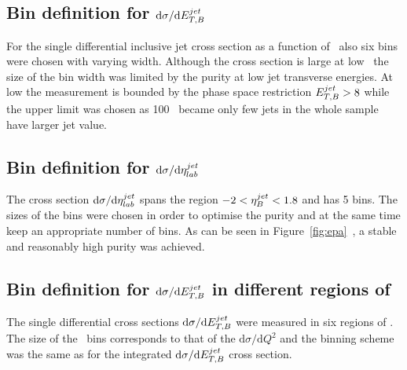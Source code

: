 \subsection*{Bin definition for ${\mathrm{d}\sigma}/{\mathrm{d}\mbox{$E_{T,B}^{jet}$}}$}
\label{subsec:bindefet}
For the single differential inclusive jet cross section as a function of \etjetb~also six bins were chosen with varying width. Although the cross section is large at low \etjetb~the size of the bin width was limited by the purity at low jet transverse energies. At low \etjetb the measurement is bounded by the phase space restriction $\mbox{$E_{T,B}^{jet}$} > 8$ \GeV while the upper limit was chosen as 100 \GeV~became only few jets in the whole sample have larger jet \etjetb value.
\subsection*{Bin definition for ${\mathrm{d}\sigma}/{\mathrm{d}\mbox{$\eta^{jet}_{lab}$}}$}
\label{subsec:bindefeta}
The cross section ${\mathrm{d}\sigma}/{\mathrm{d}\mbox{$\eta^{jet}_{lab}$}}$ spans the region $-2<\mbox{$\eta_B^{jet}$}<1.8$ and has 5 bins. The sizes of the bins were chosen in order to optimise the purity and at the same time keep an appropriate number of bins. As can be seen in Figure~\ref{fig:epa}~, a stable and reasonably high purity was achieved.
\subsection*{Bin definition for ${\mathrm{d}\sigma}/{\mathrm{d}\mbox{$E_{T,B}^{jet}$}}$ in different regions of \qsq}
\label{subsec:bindefetinq2}
The single differential cross sections ${\mathrm{d}\sigma}/{\mathrm{d}\mbox{$E_{T,B}^{jet}$}}$ were measured in six regions of \qsq. The size of the \qsq~bins corresponds to that of the ${\mathrm{d}\sigma}/{\mathrm{d}Q^2}$ and the \etjetb binning scheme was the same as for the integrated ${\mathrm{d}\sigma}/{\mathrm{d}\mbox{$E_{T,B}^{jet}$}}$ cross section.


